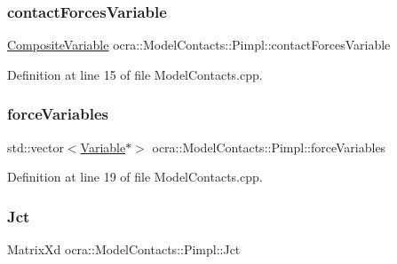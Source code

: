 \hypertarget{structocra_1_1ModelContacts_1_1Pimpl_a274e86267cd0b9dba8105fda27fda205}{}\label{structocra_1_1ModelContacts_1_1Pimpl_a274e86267cd0b9dba8105fda27fda205} 
\subsubsection{\texorpdfstring{contact\+Forces\+Variable}{contactForcesVariable}}
{\footnotesize\ttfamily \hyperlink{classocra_1_1CompositeVariable}{Composite\+Variable} ocra\+::\+Model\+Contacts\+::\+Pimpl\+::contact\+Forces\+Variable}



Definition at line 15 of file Model\+Contacts.\+cpp.

\hypertarget{structocra_1_1ModelContacts_1_1Pimpl_a133837a5c20241ac20b41c0fb7401682}{}\label{structocra_1_1ModelContacts_1_1Pimpl_a133837a5c20241ac20b41c0fb7401682} 
\subsubsection{\texorpdfstring{force\+Variables}{forceVariables}}
{\footnotesize\ttfamily std\+::vector$<$\hyperlink{classocra_1_1Variable}{Variable}$\ast$$>$ ocra\+::\+Model\+Contacts\+::\+Pimpl\+::force\+Variables}



Definition at line 19 of file Model\+Contacts.\+cpp.

\hypertarget{structocra_1_1ModelContacts_1_1Pimpl_ae11aa9cbd6a04aebd3039556c3da027b}{}\label{structocra_1_1ModelContacts_1_1Pimpl_ae11aa9cbd6a04aebd3039556c3da027b} 
\subsubsection{\texorpdfstring{Jct}{Jct}}
{\footnotesize\ttfamily Matrix\+Xd ocra\+::\+Model\+Contacts\+::\+Pimpl\+::\+Jct}



